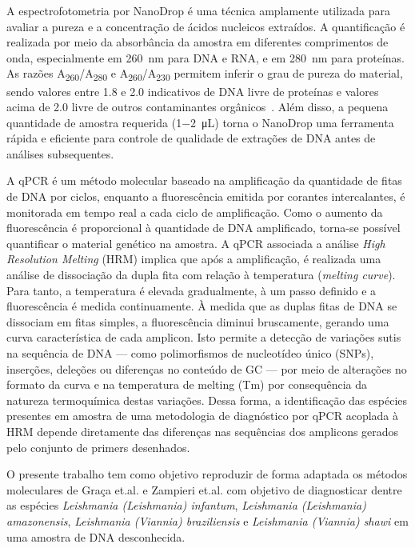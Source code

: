 A espectrofotometria por NanoDrop é uma técnica amplamente utilizada para
avaliar a pureza e a concentração de ácidos nucleicos extraídos. A quantificação
é realizada por meio da absorbância da amostra em diferentes comprimentos de
onda, especialmente em \qty{260}{\nano\meter} para DNA e RNA, e em 
\qty{280}{\nano\meter} para proteínas. As razões
A\textsubscript{260}/A\textsubscript{280} e
A\textsubscript{260}/A\textsubscript{230} permitem inferir o grau de pureza do
material, sendo valores entre \num{1.8} e \num{2.0} indicativos de DNA livre de
proteínas e valores acima de \num{2.0} livre de outros contaminantes
orgânicos~\cite{nanodrop}. Além disso, a pequena quantidade de amostra requerida
(\qty{1-2}{\micro\liter}) torna o NanoDrop uma ferramenta rápida e eficiente para
controle de qualidade de extrações de DNA antes de análises subsequentes.

A qPCR é um método molecular baseado na amplificação da quantidade de fitas de
DNA por ciclos, enquanto a fluorescência emitida por corantes intercalantes, é
monitorada em tempo real a cada ciclo de amplificação.  Como o aumento da
fluorescência é proporcional à quantidade de DNA amplificado, torna-se possível
quantificar o material genético na amostra\cite{Galluzi2018}.  A qPCR associada
a análise \textit{High Resolution Melting} (HRM) implica que após a
amplificação, é realizada uma análise de dissociação da dupla fita com relação à
temperatura (\textit{melting curve}). Para tanto, a temperatura é elevada
gradualmente, à um passo definido e a fluorescência é medida continuamente. À
medida que as duplas fitas de DNA se dissociam em fitas simples, a fluorescência
diminui bruscamente, gerando uma curva característica de cada amplicon. Isto
permite a detecção de variações sutis na sequência de DNA — como polimorfismos
de nucleotídeo único (SNPs), inserções, deleções ou diferenças no conteúdo de GC
— por meio de alterações no formato da curva e na temperatura de melting
(Tm)\cite{Wittwer2009} por consequência da natureza termoquímica destas
variações. Dessa forma, a identificação das espécies presentes em amostra de uma
metodologia de diagnóstico por qPCR acoplada à HRM depende diretamente das
diferenças nas sequências dos amplicons gerados pelo conjunto de primers
desenhados. 

O presente trabalho tem como objetivo reproduzir de forma adaptada os métodos
moleculares de Graça et.al.\cite{RFLPgraca2012} e Zampieri
et.al.\cite{HRMzampi2016} com objetivo de diagnosticar dentre as espécies
\textit{Leishmania (Leishmania) infantum}, \textit{Leishmania (Leishmania)
amazonensis}, \textit{Leishmania (Viannia) braziliensis} e \textit{Leishmania
(Viannia) shawi} em uma amostra de DNA desconhecida. 
